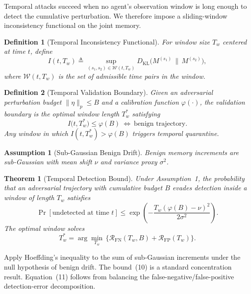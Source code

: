 \documentclass[conference]{IEEEtran}
\newtheorem{theorem}{Theorem}
\newtheorem{definition}{Definition}
\newtheorem{assumption}{Assumption}
\begin{document}
Temporal attacks succeed when no agent's observation window is long
enough to detect the cumulative perturbation. We therefore impose a
sliding-window inconsistency functional on the joint memory.

\begin{definition}[Temporal Inconsistency Functional]
For window size $T_w$ centered at time $t$, define
\begin{equation}
I(t, T_w) \triangleq \sup_{(s_1, s_2) \in \mathcal{W}(t,T_w)}
D_{\mathrm{KL}}\bigl(M^{(s_1)} \,\big\|\, M^{(s_2)}\bigr),
\end{equation}
where $\mathcal{W}(t, T_w)$ is the set of admissible time pairs in
the window.
\end{definition}

\begin{definition}[Temporal Validation Boundary]
Given an adversarial perturbation budget $\|\eta\|_p \leq B$ and a
calibration function $\varphi(\cdot)$, the validation boundary is
the optimal window length $T_w^{*}$ satisfying
\begin{equation}
I\bigl(t, T_w^{*}\bigr) \leq \varphi(B)
\ \Leftrightarrow\ \text{benign trajectory}.
\end{equation}
Any window in which $I(t, T_w^{*}) > \varphi(B)$ triggers temporal
quarantine.
\end{definition}

\begin{assumption}[Sub-Gaussian Benign Drift]
Benign memory increments are sub-Gaussian with mean shift $\nu$ and
variance proxy $\sigma^2$.
\end{assumption}

\begin{theorem}[Temporal Detection Bound]
Under Assumption~1, the probability that an adversarial trajectory
with cumulative budget $B$ evades detection inside a window of length
$T_w$ satisfies
\begin{equation}
\Pr[\text{undetected at time } t] \leq
\exp\!\left(-\frac{T_w(\varphi(B) - \nu)^2}{2\sigma^2}\right).
\end{equation}
The optimal window solves
\begin{equation}
T_w^{*} = \arg\min_{T_w}\,\bigl\{\mathcal{R}_{\mathrm{FN}}(T_w, B)
+ \mathcal{R}_{\mathrm{FP}}(T_w)\bigr\}.
\end{equation}
\end{theorem}

\begin{IEEEproof}
Apply Hoeffding's inequality to the sum of sub-Gaussian increments
under the null hypothesis of benign drift. The bound~(10) is a
standard concentration result. Equation~(11) follows from balancing
the false-negative/false-positive detection-error decomposition.
\end{IEEEproof}
\end{document}
